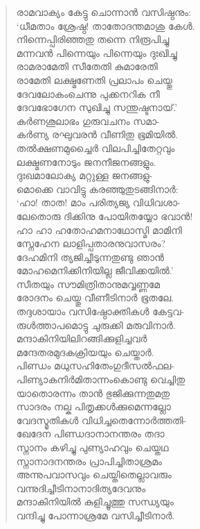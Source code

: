 \begin{verse}
രാമവാക്യം കേട്ടു ചൊന്നാന്‍ വസിഷ്ഠനും:\\
‘ധീമതാം ശ്രേഷ്ഠ! താതോദന്തമാശു കേള്‍.\\
നിന്നെപ്പിരിഞ്ഞതു തന്നെ നിരൂപിച്ചു\\
മന്നവന്‍ പിന്നെയും പിന്നെയും ദുഃഖിച്ചു\\
രാമരാമേതി സീതേതി കുമാരേതി\\
രാമേതി ലക്ഷ്മണേതി പ്രലാപം ചെയ്തു\\
ദേവലോകംചെന്നു പുക്കനറിക നീ\\
ദേവഭോഗേന സുഖിച്ചു സന്തുഷ്ടനായ്.’\\
കര്‍ണശൂലാഭം ഗുരുവചനം സമാ-\\
കര്‍ണ്യ രഘുവരന്‍ വീണിതു ഭൂമിയില്‍.\\
തല്‍ക്ഷണമുച്ചൈര്‍ വിലപിച്ചിതേറ്റവും\\
ലക്ഷ്മണനോടും ജനനീജനങ്ങളും.\\
ദുഃഖമാലോക്യ മറ്റുള്ള ജനങ്ങളു-\\
മൊക്കെ വാവിട്ടു കരഞ്ഞുതുടങ്ങിനാര്‍:\\
‘ഹാ! താത! മാം പരിത്യജ്യ വിധിവശാ-\\
ലേതൊരു ദിക്കിനു പോയിതയ്യോ ഭവാന്‍!\\
ഹാ ഹാ ഹതോഹമനാഥോസ്മി മാമിനി\\
സ്നേഹേന ലാളിപ്പതാരനുവാസരം?\\
ദേഹമിനി ത്യജിച്ചീടുന്നതുണ്ടു ഞാന്‍\\
മോഹമെനിക്കിനിയില്ല ജീവിക്കയില്‍.’\\
സീതയും സൗമിത്രിതാനുമവ്വണ്ണമേ\\
രോദനം ചെയ്തു വീണീടിനാര്‍ ഭൂതലേ.\\
തദ്ദശായാം വസിഷ്ഠോക്തികള്‍ കേട്ടവ-\\
രുള്‍ത്താപമൊട്ടു ചുരുക്കി മരുവിനാര്‍.\\
മന്ദാകിനിയിലിറങ്ങിക്കുളിച്ചവര്‍\\
മന്ദേതരമുദകക്രിയയും ചെയ്താര്‍.\\
പിണ്ഡം മധുസഹിതേംഗുദീസല്‍ഫല-\\
പിണ്യാകനിര്‍മിതാന്നംകൊണ്ടു വെച്ചിതു\\
യാതൊരന്നം താന്‍ ഭുജിക്കുന്നതുമതു\\
സാദരം നല്ക പിതൃക്കള്‍ക്കുമെന്നല്ലോ\\
വേദസ്മൃതികള്‍ വിധിച്ചതെന്നോര്‍ത്തതി-\\
ഖേദേന പിണ്ഡദാനാനന്തരം തദാ\\
സ്നാനം കഴിച്ചു പുണ്യാഹവും ചെയ്തഥ\\
സ്നാനാദനന്തരം പ്രാപിച്ചിതാശ്രമം\\
അന്നുപവാസവും ചെയ്തിതെല്ലാവരും\\
വന്നുദിച്ചീടിനാനാദിത്യദേവനും\\
മന്ദാകിനിയില്‍ കുളിച്ചൂത്തു സന്ധ്യയും\\
വന്ദിച്ചു പോന്നാശ്രമേ വസിച്ചീടിനാര്‍.
\end{verse}

